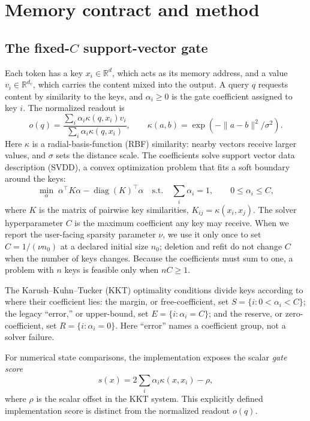 \section{Memory contract and method}\label{sec:method}

\subsection{The fixed-\(C\) support-vector gate}\label{sec:gate}

Each token has a key \(x_i\in\mathbb{R}^d\), which acts as its memory address,
and a value \(v_i\in\mathbb{R}^{d_v}\), which carries the content mixed into
the output. A query \(q\) requests content by similarity to the keys, and
\(\alpha_i\geq0\) is the gate coefficient assigned to key \(i\). The normalized
readout is
\begin{equation}
o(q)=
\frac{\sum_i \alpha_i\kappa(q,x_i)v_i}
     {\sum_i \alpha_i\kappa(q,x_i)},\qquad
\kappa(a,b)=\exp(-\lVert a-b\rVert^2/\sigma^2).
\end{equation}
Here \(\kappa\) is a radial-basis-function (RBF) similarity: nearby vectors
receive larger values, and \(\sigma\) sets the distance scale. The coefficients
solve support vector data description (SVDD), a convex optimization problem
that fits a soft boundary around the keys:
\begin{equation}
\min_{\alpha}\;
\alpha^\top K\alpha-\operatorname{diag}(K)^\top\alpha
\quad\text{s.t.}\quad
\sum_i\alpha_i=1,\qquad 0\leq\alpha_i\leq C,
\label{eq:svdd}
\end{equation}
where \(K\) is the matrix of pairwise key similarities,
\(K_{ij}=\kappa(x_i,x_j)\). The solver hyperparameter \(C\) is the maximum
coefficient any key may receive. When we report the user-facing sparsity
parameter \(\nu\), we use it only once
to set \(C=1/(\nu n_0)\) at a declared initial size \(n_0\); deletion and refit
do not change \(C\) when the number of keys changes. Because the coefficients
must sum to one, a problem with \(n\) keys is feasible only when \(nC\geq1\).

The Karush--Kuhn--Tucker (KKT) optimality conditions divide keys according to
where their coefficient lies: the margin, or free-coefficient, set
\(S=\{i:0<\alpha_i<C\}\); the legacy ``error,'' or upper-bound, set
\(E=\{i:\alpha_i=C\}\); and the reserve, or zero-coefficient, set
\(R=\{i:\alpha_i=0\}\). Here ``error'' names a coefficient group, not a solver
failure.

For numerical state comparisons, the implementation exposes the scalar
\emph{gate score}
\begin{equation}
s(x)=2\sum_i\alpha_i\kappa(x,x_i)-\rho,
\label{eq:gate-score}
\end{equation}
where \(\rho\) is the scalar offset in the KKT system. This explicitly defined
implementation score is distinct from the normalized readout \(o(q)\).

